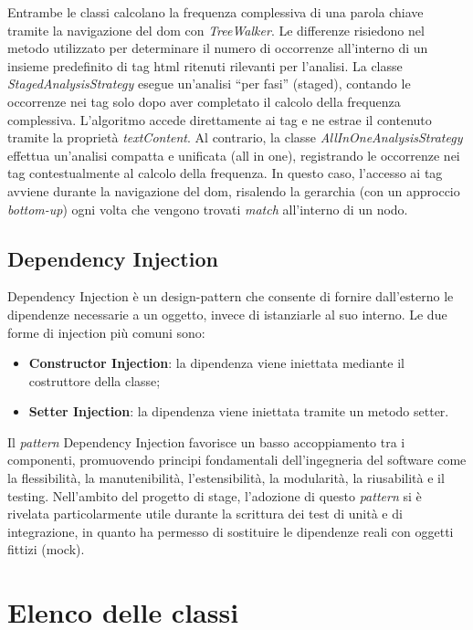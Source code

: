 \vspace{10pt}
\noindent Entrambe le classi calcolano la frequenza complessiva di una parola chiave tramite la navigazione del \gls{dom} con \textit{TreeWalker}. Le differenze risiedono nel metodo utilizzato per determinare il numero di occorrenze all’interno di un insieme predefinito di tag \gls{html} ritenuti rilevanti per l’analisi. La classe \textit{StagedAnalysisStrategy} esegue un’analisi “per fasi” (staged), contando le occorrenze nei tag solo dopo aver completato il calcolo della frequenza complessiva. L’algoritmo accede direttamente ai tag e ne estrae il contenuto tramite la proprietà \textit{textContent}. Al contrario, la classe \textit{AllInOneAnalysisStrategy} effettua un’analisi compatta e unificata (all in one), registrando le occorrenze nei tag contestualmente al calcolo della frequenza. In questo caso, l’accesso ai tag avviene durante la navigazione del \gls{dom}, risalendo la gerarchia (con un approccio \textit{bottom-up}) ogni volta che vengono trovati \textit{match} all’interno di un nodo.

\subsection{Dependency Injection}

Dependency Injection è un \gls{design-pattern} che consente di fornire dall’esterno le dipendenze necessarie a un oggetto, invece di istanziarle al suo interno. Le due forme di injection più comuni sono:
\begin{itemize}
  \item \textbf{Constructor Injection}: la dipendenza viene iniettata mediante il costruttore della classe;
  \item \textbf{Setter Injection}: la dipendenza viene iniettata tramite un metodo setter.
\end{itemize}

\vspace{5pt}
\noindent Il \textit{pattern} Dependency Injection favorisce un basso accoppiamento tra i componenti, promuovendo principi fondamentali dell’ingegneria del software come la flessibilità, la manutenibilità, l’estensibilità, la modularità, la riusabilità e il testing. Nell’ambito del progetto di stage, l’adozione di questo \textit{pattern} si è rivelata particolarmente utile durante la scrittura dei test di unità e di integrazione, in quanto ha permesso di sostituire le dipendenze reali con oggetti fittizi (mock).

\section{Elenco delle classi}
\label{sec:elenco-classi}

